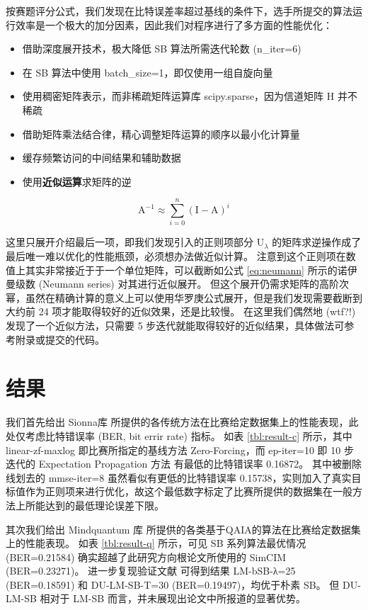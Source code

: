 \documentclass[withoutpreface,bwprint]{cumcmthesis}
\begin{document}
按赛题评分公式，我们发现在比特误差率超过基线的条件下，选手所提交的算法运行效率是一个极大的加分因素，因此我们对程序进行了多方面的性能优化：

\begin{itemize}
\item 借助深度展开技术，极大降低 SB 算法所需迭代轮数 (n\_iter=6)
\item 在 SB 算法中使用 batch\_size=1，即仅使用一组自旋向量
\item 使用稠密矩阵表示，而非稀疏矩阵运算库 scipy.sparse，因为信道矩阵 $ \mathrm H $ 并不稀疏
\item 借助矩阵乘法结合律，精心调整矩阵运算的顺序以最小化计算量
\item 缓存频繁访问的中间结果和辅助数据
\item 使用\textbf{近似运算}求矩阵的逆
\end{itemize}

\begin{equation}
\mathrm A^{-1} \approx \sum\limits_{i=0}^n (\mathrm I - \mathrm A)^i
\label{eq:neumann}
\end{equation}

这里只展开介绍最后一项，即我们发现引入的正则项部分 $ \mathrm U_\lambda $ 的矩阵求逆操作成了最后唯一难以优化的性能瓶颈，必须想办法做近似计算。
注意到这个正则项在数值上其实非常接近于于一个单位矩阵，可以截断如公式 \ref{eq:neumann} 所示的诺伊曼级数 (Neumann series) 对其进行近似展开。
但这个展开仍需求矩阵的高阶次幂，虽然在精确计算的意义上可以使用华罗庚公式展开，但是我们发现需要截断到大约前 24 项才能取得较好的近似效果，还是比较慢。
在这里我们偶然地 (wtf?!) 发现了一个近似方法，只需要 5 步迭代就能取得较好的近似结果，具体做法可参考附录或提交的代码。


\section{结果}

我们首先给出 Sionna库 \cite{sionna2022} 所提供的各传统方法在比赛给定数据集上的性能表现，此处仅考虑比特错误率 (BER, bit errir rate) 指标。
如表 \ref{tbl:result-c} 所示，其中 linear-zf-maxlog 即比赛所指定的基线方法 Zero-Forcing，而 ep-iter=10 即 10 步迭代的 Expectation Propagation 方法 \cite{Wang2020} 有最低的比特错误率 0.16872。
其中被删除线划去的 mmse-iter=8 虽然看似有更低的比特错误率 0.15738，实则加入了真实目标值作为正则项来进行优化，故这个最低数字标定了比赛所提供的数据集在一般方法上所能达到的最低理论误差下限。

其次我们给出 Mindquantum 库 \cite{mindquantum2021} 所提供的各类基于QAIA的算法在比赛给定数据集上的性能表现。
如表 \ref{tbl:result-q} 所示，可见 SB 系列算法最优情况 (BER=0.21584) 确实超越了此研究方向根论文所使用的 SimCIM (BER=0.23271)。
进一步复现验证文献 \cite{Takabe2023} 可得到结果 LM-bSB-λ=25 (BER=0.18591) 和 DU-LM-SB-T=30 (BER=0.19497)，均优于朴素 SB。
但 DU-LM-SB 相对于 LM-SB 而言，并未展现出论文中所报道的显著优势。
\end{document}
